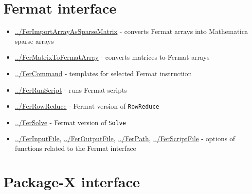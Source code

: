 \documentclass[../FeynHelpersManual.tex]{subfiles}
\begin{document}
\hypertarget{fermat interface}{
\section{Fermat interface}\label{fermat interface}}

\begin{itemize}
\tightlist
\item
  \hyperlink{../ferimportarrayassparsematrix}{../FerImportArrayAsSparseMatrix}
  - converts Fermat arrays into Mathematica sparse arrays
\item
  \hyperlink{../fermatrixtofermatarray}{../FerMatrixToFermatArray} -
  converts matrices to Fermat arrays
\item
  \hyperlink{../fercommand}{../FerCommand} - templates for selected
  Fermat instruction
\item
  \hyperlink{../ferrunscript}{../FerRunScript} - runs Fermat scripts
\item
  \hyperlink{../ferrowreduce}{../FerRowReduce} - Fermat version of
  \texttt{RowReduce}
\item
  \hyperlink{../fersolve}{../FerSolve} - Fermat version of
  \texttt{Solve}
\item
  \hyperlink{../ferinputfile}{../FerInputFile},
  \hyperlink{../feroutputfile}{../FerOutputFile},
  \hyperlink{../ferpath}{../FerPath},
  \hyperlink{../ferscriptfile}{../FerScriptFile} - options of functions
  related to the Fermat interface
\end{itemize}

\hypertarget{package-x interface}{
\section{Package-X interface}\label{package-x interface}}
\end{document}
